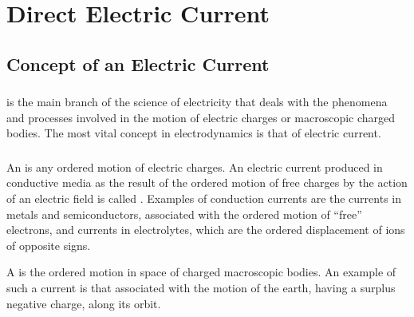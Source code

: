 





\chapter{Direct Electric Current}
\label{ch-20}

\section{Concept of an Electric Current}
\label{sec-20.1}

\subsection{}\label{20.1.1} 
 is the main branch of the science of electricity that deals with the phenomena and processes involved in the motion of electric charges or macroscopic charged bodies. The most vital concept in electrodynamics is that of electric current.

\subsection{}\label{20.1.2} An  is any ordered motion of electric charges. An electric current produced in conductive media as the result of the ordered motion of free charges by the action of an electric field is called . Examples of conduction currents are the currents in metals and semiconductors, associated with the ordered motion of ``free'' electrons, and currents in electrolytes, which are the ordered displacement of ions of opposite signs.

A  is the ordered motion in space of charged macroscopic bodies. An example of such a current is that associated with the motion of the earth, having a surplus negative charge, along its orbit.

